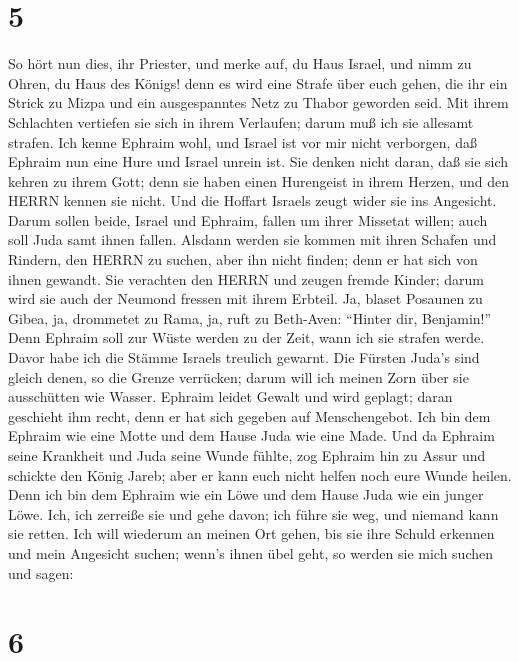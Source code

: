 \hypertarget{section-4}{%
\section{5}\label{section-4}}

 So hört nun dies, ihr Priester, und merke auf, du Haus
Israel, und nimm zu Ohren, du Haus des Königs! denn es wird eine Strafe
über euch gehen, die ihr ein Strick zu Mizpa und ein ausgespanntes Netz
zu Thabor geworden seid.  Mit ihrem Schlachten vertiefen sie
sich in ihrem Verlaufen; darum muß ich sie allesamt strafen.
 Ich kenne Ephraim wohl, und Israel ist vor mir nicht
verborgen, daß Ephraim nun eine Hure und Israel unrein ist. 
Sie denken nicht daran, daß sie sich kehren zu ihrem Gott; denn sie
haben einen Hurengeist in ihrem Herzen, und den HERRN kennen sie nicht.
 Und die Hoffart Israels zeugt wider sie ins Angesicht.
Darum sollen beide, Israel und Ephraim, fallen um ihrer Missetat willen;
auch soll Juda samt ihnen fallen.  Alsdann werden sie kommen
mit ihren Schafen und Rindern, den HERRN zu suchen, aber ihn nicht
finden; denn er hat sich von ihnen gewandt.  Sie verachten
den HERRN und zeugen fremde Kinder; darum wird sie auch der Neumond
fressen mit ihrem Erbteil.  Ja, blaset Posaunen zu Gibea,
ja, drommetet zu Rama, ja, ruft zu Beth-Aven: ``Hinter dir, Benjamin!''
 Denn Ephraim soll zur Wüste werden zu der Zeit, wann ich
sie strafen werde. Davor habe ich die Stämme Israels treulich gewarnt.
 Die Fürsten Juda's sind gleich denen, so die Grenze
verrücken; darum will ich meinen Zorn über sie ausschütten wie Wasser.
 Ephraim leidet Gewalt und wird geplagt; daran geschieht
ihm recht, denn er hat sich gegeben auf Menschengebot.  Ich
bin dem Ephraim wie eine Motte und dem Hause Juda wie eine Made.
 Und da Ephraim seine Krankheit und Juda seine Wunde
fühlte, zog Ephraim hin zu Assur und schickte den König Jareb; aber er
kann euch nicht helfen noch eure Wunde heilen.  Denn ich
bin dem Ephraim wie ein Löwe und dem Hause Juda wie ein junger Löwe.
Ich, ich zerreiße sie und gehe davon; ich führe sie weg, und niemand
kann sie retten.  Ich will wiederum an meinen Ort gehen,
bis sie ihre Schuld erkennen und mein Angesicht suchen; wenn's ihnen
übel geht, so werden sie mich suchen und sagen:

\hypertarget{section-5}{%
\section{6}\label{section-5}}

